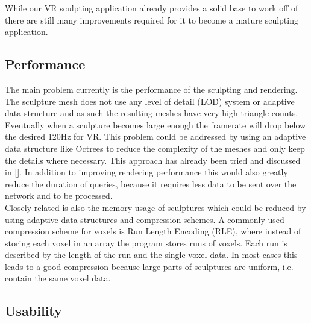 While our VR sculpting application already provides a solid base to work off of there are still many improvements required for it to become a mature sculpting application.

\subsection{Performance}
The main problem currently is the performance of the sculpting and rendering. The sculpture mesh does not use any level of detail (LOD) system or adaptive data structure and as such the resulting meshes have very high triangle counts.
Eventually when a sculpture becomes large enough the framerate will drop below the desired 120Hz for VR. This problem could be addressed by using an adaptive data structure like Octrees to reduce the complexity of the meshes and only keep the details where necessary. This approach has already been tried and discussed in []. In addition to improving rendering performance this would also greatly reduce the duration of queries, because it requires less data to be sent over the network and to be processed.\\
Closely related is also the memory usage of sculptures which could be reduced by using adaptive data structures and compression schemes. A commonly used compression scheme for voxels is Run Length Encoding (RLE), where instead of storing
each voxel in an array the program stores runs of voxels. Each run is described by the length of the run and the single voxel data. In most cases this leads to a good compression because large parts of sculptures are uniform, i.e. contain the same voxel data.

\subsection{Usability}

